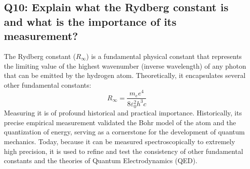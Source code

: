\documentclass[a4paper,11pt]{article}
\begin{document}
\subsection*{Q10: Explain what the Rydberg constant is and what is the importance of its measurement?}
The Rydberg constant ($R_\infty$) is a fundamental physical constant that represents the limiting value of the highest wavenumber (inverse wavelength) of any photon that can be emitted by the hydrogen atom. Theoretically, it encapsulates several other fundamental constants:
\begin{equation}
    R_\infty = \frac{m_e e^4}{8 \varepsilon_0^2 h^3 c}
\end{equation}
Measuring it is of profound historical and practical importance. Historically, its precise empirical measurement validated the Bohr model of the atom and the quantization of energy, serving as a cornerstone for the development of quantum mechanics. Today, because it can be measured spectroscopically to extremely high precision, it is used to refine and test the consistency of other fundamental constants and the theories of Quantum Electrodynamics (QED).
\end{document}
